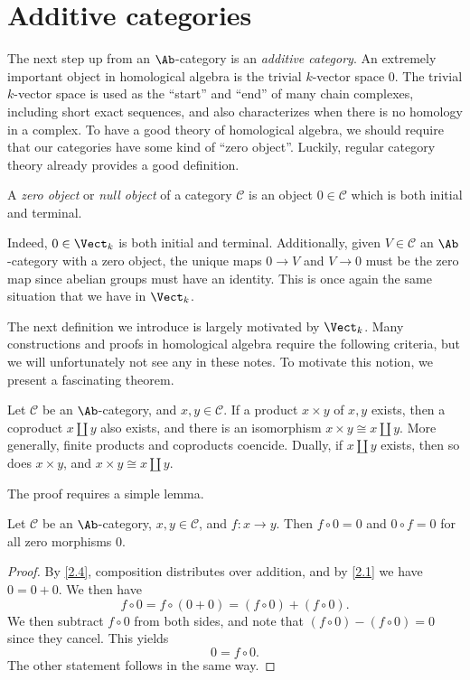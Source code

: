 \section{Additive categories}

The next step up from an $\Ab $-category is an \emph{additive category}. An extremely important object in homological algebra is the trivial $k$-vector space $0$. The trivial $k$-vector space is used as the ``start'' and ``end'' of many chain complexes, including short exact sequences, and also characterizes when there is no homology in a complex. To have a good theory of homological algebra, we should require that our categories have some kind of ``zero object''. Luckily, regular category theory already provides a good definition.

\begin{definition}\label{3.1}
	A \emph{zero object} or \emph{null object} of a category $\mathcal{C} $ is an object $0\in \mathcal{C} $ which is both initial and terminal.
\end{definition}

Indeed, $0\in\Vect_k$ is both initial and terminal. Additionally, given $V\in \mathcal{C} $ an $\Ab $-category with a zero object, the unique maps $0\to V$ and $V\to 0$ must be the zero map since abelian groups must have an identity. This is once again the same situation that we have in $\Vect_{k} $.

The next definition we introduce is largely motivated by $\Vect_k$. Many constructions and proofs in homological algebra require the following criteria, but we will unfortunately not see any in these notes. To motivate this notion, we present a fascinating theorem.

\begin{proposition}\label{3.2}
	Let $\mathcal{C} $ be an $\Ab $-category, and $x,y\in \mathcal{C} $. If a product $x\times y$ of $x,y$ exists, then a coproduct $x\amalg y$ also exists, and there is an isomorphism $x\times y \cong x\amalg y$. More generally, finite products and coproducts coencide. Dually, if $x\amalg y$ exists, then so does $x\times y$, and $x\times y \cong x\amalg y$.
\end{proposition}
The proof requires a simple lemma.
\begin{lemma}\label{3.3:NEW}
	Let $\mathcal{C} $ be an $\Ab $-category, $x,y\in \mathcal{C} $, and $f : x \to y$. Then $f\circ 0=0$ and $0\circ f=0$ for all zero morphisms 0.
\end{lemma}
\begin{proof}
	By \cref{2.4}, composition distributes over addition, and by \cref{2.1} we have $0=0+0$. We then have
	\[
		f\circ 0=f\circ (0+0)=(f\circ 0)+(f\circ 0)
	.\]
	We then subtract $f\circ 0$ from both sides, and note that $(f\circ 0)-(f\circ 0)=0$ since they cancel. This yields
	\[
		0=f\circ 0
	.\]
	The other statement follows in the same way.
\end{proof}


